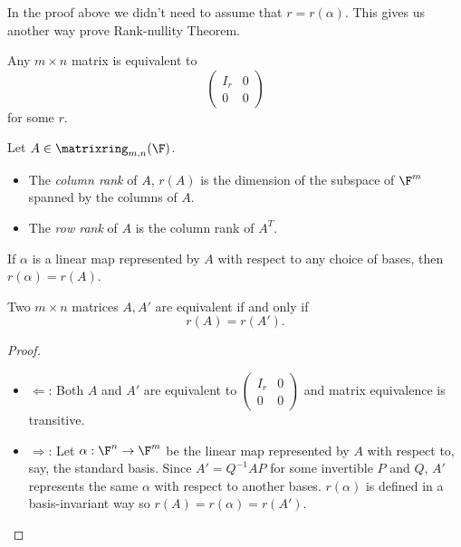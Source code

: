 \documentclass[a4paper]{article}
\newcommand*{\M}{\matrixring}
\theoremstyle{definition}
\begin{document}
\begin{remark}
  In the proof above we didn't need to assume that \(r = r(\alpha)\). This gives us another way prove Rank-nullity Theorem.
\end{remark}

\begin{corollary}
  Any \(m\times n\) matrix is equivalent to
  \[
  \begin{pmatrix}
      I_r & 0 \\
      0 & 0
    \end{pmatrix}
  \]
  for some \(r\).
\end{corollary}

\begin{definition}
  Let \(A\in \M_{m,n}(\F)\).
  \begin{itemize}
  \item The \emph{column rank} of \(A\), \(r(A)\) is the dimension of the subspace of \(\F^m\) spanned by the columns of \(A\).
  \item The \emph{row rank} of \(A\) is the column rank of \(A^T\).
  \end{itemize}
\end{definition}

\begin{note}
  If \(\alpha\) is a linear map represented by \(A\) with respect to any choice of bases, then \(r(\alpha) = r(A)\).
\end{note}

\begin{proposition}
  Two \(m\times n\) matrices \(A, A'\) are equivalent if and only if
  \[
    r(A) = r(A').
  \]
\end{proposition}

\begin{proof}\leavevmode
  \begin{itemize}
  \item \(\Leftarrow\): Both \(A\) and \(A'\) are equivalent to \(
    \begin{pmatrix}
      I_r & 0 \\
      0 & 0
    \end{pmatrix}
    \) and matrix equivalence is transitive.
  \item \(\Rightarrow\): Let \(\alpha:\F^n\to \F^m\) be the linear map represented by \(A\) with respect to, say, the standard basis. Since \(A'=Q^{-1}AP\) for some invertible \(P\) and \(Q\), \(A'\) represents the same \(\alpha\) with respect to another bases. \(r(\alpha)\) is defined in a basis-invariant way so \(r(A) = r(\alpha) = r(A')\).
  \end{itemize}
\end{proof}
\end{document}
